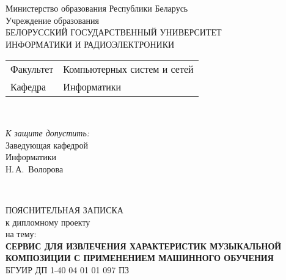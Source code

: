 \begin{titlepage}
  \begin{center}
    Министерство образования Республики Беларусь\\[1em]
    Учреждение образования\\
    БЕЛОРУССКИЙ ГОСУДАРСТВЕННЫЙ УНИВЕРСИТЕТ \\
    ИНФОРМАТИКИ И РАДИОЭЛЕКТРОНИКИ\\[1em]

    \begin{minipage}{\textwidth}
      \begin{flushleft}
        \begin{tabular}{ l l }
          Факультет & Компьютерных систем и сетей\\
          Кафедра   & Информатики
        \end{tabular}
      \end{flushleft}
    \end{minipage}\\[1em]

    \begin{flushright}
      \begin{minipage}{0.4\textwidth}
        \textit{К защите допустить:}\\[0.8em]
        Заведующая кафедрой\\ Информатики\\[0.45em]
        \underline{\hspace*{2.8cm}} Н.\,А.~Волорова
      \end{minipage}\\[2.2em]
    \end{flushright}

    {ПОЯСНИТЕЛЬНАЯ ЗАПИСКА}\\
    {к дипломному проекту}\\
    {на тему:}\\[1em]
    \textbf{\large СЕРВИС ДЛЯ ИЗВЛЕЧЕНИЯ ХАРАКТЕРИСТИК МУЗЫКАЛЬНОЙ КОМПОЗИЦИИ С ПРИМЕНЕНИЕМ МАШИННОГО ОБУЧЕНИЯ}\\[1em]


    {БГУИР ДП 1-40 04 01 01 097 ПЗ}\\[2em]


\end{center}
\end{titlepage}
